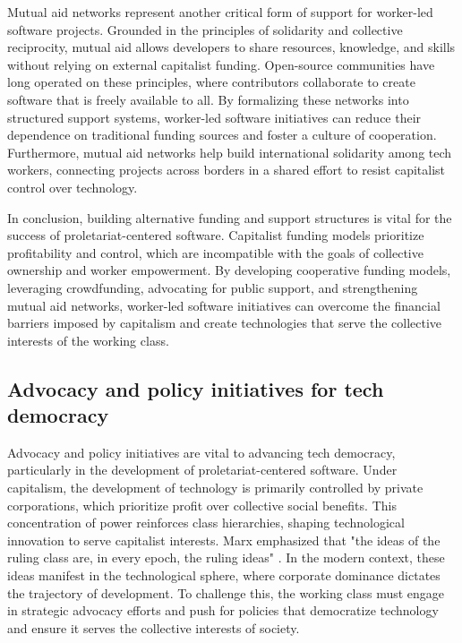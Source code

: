 \begin{refsection}
Mutual aid networks represent another critical form of support for worker-led software projects. Grounded in the principles of solidarity and collective reciprocity, mutual aid allows developers to share resources, knowledge, and skills without relying on external capitalist funding. Open-source communities have long operated on these principles, where contributors collaborate to create software that is freely available to all. By formalizing these networks into structured support systems, worker-led software initiatives can reduce their dependence on traditional funding sources and foster a culture of cooperation. Furthermore, mutual aid networks help build international solidarity among tech workers, connecting projects across borders in a shared effort to resist capitalist control over technology.

In conclusion, building alternative funding and support structures is vital for the success of proletariat-centered software. Capitalist funding models prioritize profitability and control, which are incompatible with the goals of collective ownership and worker empowerment. By developing cooperative funding models, leveraging crowdfunding, advocating for public support, and strengthening mutual aid networks, worker-led software initiatives can overcome the financial barriers imposed by capitalism and create technologies that serve the collective interests of the working class.

\subsection{Advocacy and policy initiatives for tech democracy}

Advocacy and policy initiatives are vital to advancing tech democracy, particularly in the development of proletariat-centered software. Under capitalism, the development of technology is primarily controlled by private corporations, which prioritize profit over collective social benefits. This concentration of power reinforces class hierarchies, shaping technological innovation to serve capitalist interests. Marx emphasized that "the ideas of the ruling class are, in every epoch, the ruling ideas" \cite[pp.~64]{marx_german_ideology_2011}. In the modern context, these ideas manifest in the technological sphere, where corporate dominance dictates the trajectory of development. To challenge this, the working class must engage in strategic advocacy efforts and push for policies that democratize technology and ensure it serves the collective interests of society.


\end{refsection}
